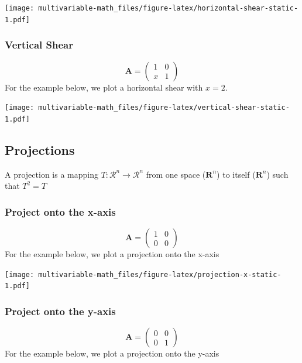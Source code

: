 \documentclass[
]{book}
\theoremstyle{definition}
\theoremstyle{definition}
\theoremstyle{definition}
\theoremstyle{definition}
\theoremstyle{remark}
\begin{document}
\texttt{[image: multivariable-math\_files/figure-latex/horizontal-shear-static-1.pdf]}

\hypertarget{vertical-shear}{%
\subsubsection{Vertical Shear}\label{vertical-shear}}

\[
\mathbf{A} = \begin{pmatrix}
1 & 0 \\
x & 1
\end{pmatrix}
\]
For the example below, we plot a horizontal shear with \(x = 2\).

\texttt{[image: multivariable-math\_files/figure-latex/vertical-shear-static-1.pdf]}

\hypertarget{projections}{%
\subsection{Projections}\label{projections}}

A projection is a mapping \(T:\mathcal{R}^n \rightarrow \mathcal{R}^n\) from one space (\(\mathbf{R}^n\)) to itself (\(\mathbf{R}^n\)) such that \(T^2 = T\)

\hypertarget{project-onto-the-x-axis}{%
\subsubsection{Project onto the x-axis}\label{project-onto-the-x-axis}}

\[
\mathbf{A} = \begin{pmatrix}
1 & 0 \\
0 & 0
\end{pmatrix}
\]
For the example below, we plot a projection onto the x-axis

\texttt{[image: multivariable-math\_files/figure-latex/projection-x-static-1.pdf]}

\hypertarget{project-onto-the-y-axis}{%
\subsubsection{Project onto the y-axis}\label{project-onto-the-y-axis}}

\[
\mathbf{A} = \begin{pmatrix}
0 & 0 \\
0 & 1
\end{pmatrix}
\]
For the example below, we plot a projection onto the y-axis
\end{document}
